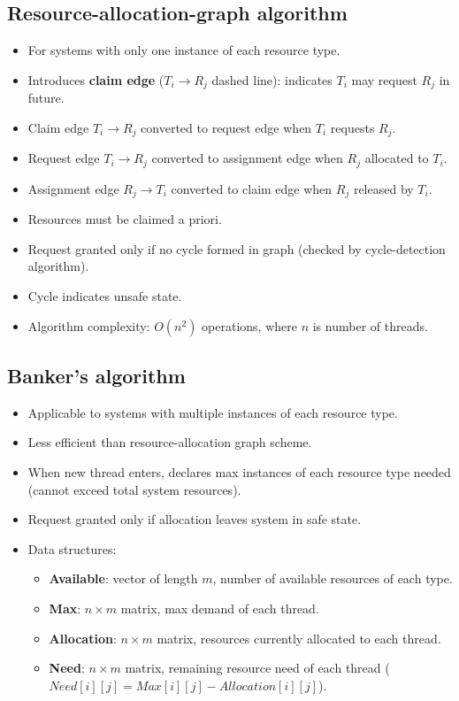 \subsection*{Resource-allocation-graph algorithm}
\begin{itemize}[noitemsep, topsep=0pt]
    \item For systems with only one instance of each resource type.
    \item Introduces \textbf{claim edge} ($T_i \to R_j$ dashed line): indicates $T_i$ may request $R_j$ in future.
    \item Claim edge $T_i \to R_j$ converted to request edge when $T_i$ requests $R_j$.
    \item Request edge $T_i \to R_j$ converted to assignment edge when $R_j$ allocated to $T_i$.
    \item Assignment edge $R_j \to T_i$ converted to claim edge when $R_j$ released by $T_i$.
    \item Resources must be claimed a priori.
    \item Request granted only if no cycle formed in graph (checked by cycle-detection algorithm).
    \item Cycle indicates unsafe state.
    \item Algorithm complexity: $O(n^2)$ operations, where $n$ is number of threads.
\end{itemize}

\subsection*{Banker's algorithm}
\begin{itemize}[noitemsep, topsep=0pt]
    \item Applicable to systems with multiple instances of each resource type.
    \item Less efficient than resource-allocation graph scheme.
    \item When new thread enters, declares max instances of each resource type needed (cannot exceed total system resources).
    \item Request granted only if allocation leaves system in safe state.
    \item Data structures:
    \begin{itemize}[noitemsep, topsep=0pt]
        \item \textbf{Available}: vector of length $m$, number of available resources of each type.
        \item \textbf{Max}: $n \times m$ matrix, max demand of each thread.
        \item \textbf{Allocation}: $n \times m$ matrix, resources currently allocated to each thread.
        \item \textbf{Need}: $n \times m$ matrix, remaining resource need of each thread ($Need[i][j] = Max[i][j] - Allocation[i][j]$).
    \end{itemize}
\end{itemize}

